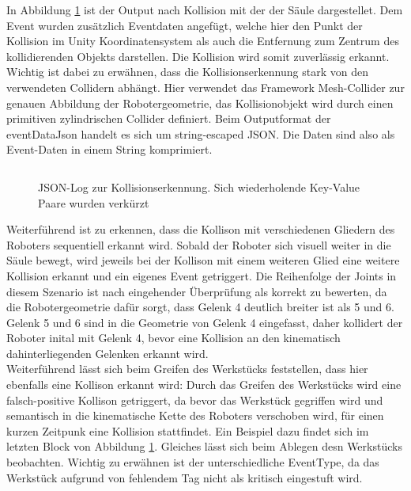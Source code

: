 In Abbildung \ref{listing:collisiondetectionerror} ist der Output nach Kollision
mit der der Säule dargestellet. Dem Event wurden zusätzlich Eventdaten angefügt,
welche hier den Punkt der Kollision im Unity Koordinatensystem als auch die
Entfernung zum Zentrum des kollidierenden Objekts darstellen. Die Kollision wird
somit zuverlässig erkannt. Wichtig ist dabei zu erwähnen, dass die
Kollisionserkennung stark von den verwendeten Collidern abhängt. Hier verwendet
das Framework Mesh-Collider zur genauen Abbildung der Robotergeometrie, das
Kollisionobjekt wird durch einen primitiven zylindrischen Collider definiert.
Beim Outputformat der eventDataJson handelt es sich um string-escaped JSON. Die
Daten sind also als Event-Daten in einem String komprimiert.\\

\begin{figure}[H]
	\inputminted[fontsize=\footnotesize]{json}{code-snippets/collisiondetection.json}
	\caption{JSON-Log zur Kollisionserkennung. Sich wiederholende Key-Value Paare wurden
		verkürzt}
	\label{listing:collisiondetectionerror}
\end{figure}

\noindent
Weiterführend ist zu erkennen, dass die Kollison mit verschiedenen Gliedern des
Roboters sequentiell erkannt wird. Sobald der Roboter sich visuell weiter in die
Säule bewegt, wird jeweils bei der Kollison mit einem weiteren Glied eine
weitere Kollision erkannt und ein eigenes Event getriggert. Die Reihenfolge der
Joints in diesem Szenario ist nach eingehender Überprüfung als korrekt zu
bewerten, da die Robotergeometrie dafür sorgt, dass Gelenk 4 deutlich breiter
ist als 5 und 6. Gelenk 5 und 6 sind in die Geometrie von Gelenk 4 eingefasst,
daher kollidert der Roboter inital mit Gelenk 4, bevor eine Kollision an den
kinematisch dahinterliegenden Gelenken erkannt wird.\\

\noindent Weiterführend lässt sich beim Greifen des Werkstücks feststellen, dass
hier ebenfalls eine Kollison erkannt wird: Durch das Greifen des Werkstücks wird
eine falsch-positive Kollison getriggert, da bevor das Werkstück gegriffen wird
und semantisch in die kinematische Kette des Roboters verschoben wird, für einen
kurzen Zeitpunk eine Kollision stattfindet. Ein Beispiel dazu findet sich im
letzten Block von Abbildung \ref{listing:collisiondetectionerror}. Gleiches
lässt sich beim Ablegen desn Werkstücks beobachten. Wichtig zu erwähnen ist der
unterschiedliche EventType, da das Werkstück aufgrund von fehlendem Tag nicht
als kritisch eingestuft wird.


